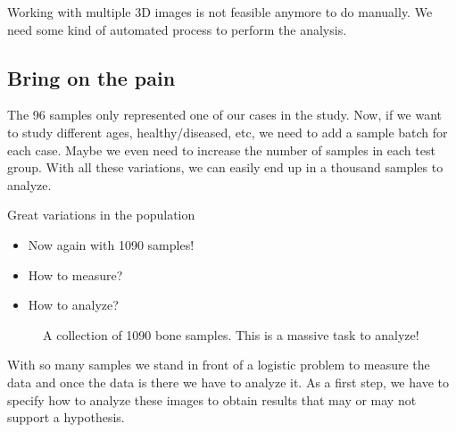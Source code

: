 \documentclass[letterpaper,10pt,english]{sphinxmanual}
\begin{document}
\sphinxAtStartPar
Working with multiple 3D images is not feasible anymore to do manually. We need some kind of automated process to perform the analysis.


\subsection{Bring on the pain}
\label{\detokenize{01-Introduction:bring-on-the-pain}}
\sphinxAtStartPar
The 96 samples only represented one of our cases in the study. Now, if we want to study different ages, healthy/diseased, etc, we need to add a sample batch for each case. Maybe we even need to increase the number of samples in each test group. With all these variations, we can easily end up in a thousand samples to analyze.

\sphinxAtStartPar
Great variations in the population
\begin{itemize}
\item {} 
\sphinxAtStartPar
Now again with 1090 samples!

\item {} 
\sphinxAtStartPar
How to measure?

\item {} 
\sphinxAtStartPar
How to analyze?

\end{itemize}



\begin{figure}[htbp]
\centering
\capstart

\noindent{}
\caption{A collection of 1090 bone samples. This is a massive task to analyze!}\label{\detokenize{01-Introduction:id12}}\end{figure}

\sphinxAtStartPar
With so many samples we stand in front of a logistic problem to measure the data and once the data is there we have to analyze it. As a first step, we have to specify how to analyze these images to obtain results that may or may not support a hypothesis.
\end{document}
